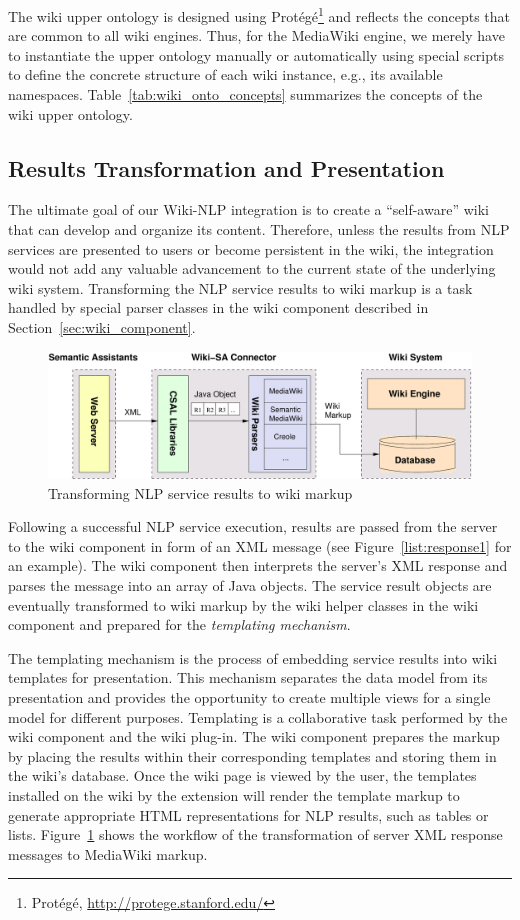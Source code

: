 The wiki upper ontology is designed using Prot\'{e}g\'{e}\footnote{Prot\'{e}g\'{e}, \url{http://protege.stanford.edu/}} and reflects the concepts that are common to all wiki engines. Thus, for the MediaWiki engine, we merely have to instantiate the upper ontology manually or automatically using special scripts to define the concrete structure of each wiki instance, e.g., its available namespaces. Table~\ref{tab:wiki_onto_concepts} summarizes the concepts of the wiki upper ontology.

\subsection{Results Transformation and Presentation}
The ultimate goal of our Wiki-NLP integration is to create a ``self-aware'' wiki that can develop and organize its content. Therefore, unless the results from NLP services are presented to users or become persistent in the wiki, the integration would not add any valuable advancement to the current state of the underlying wiki system. Transforming the NLP service results to wiki markup is a task handled by special parser classes in the wiki component described in Section~\ref{sec:wiki_component}.

\begin{figure}[h!]
\centering
\includegraphics[width=0.7\columnwidth]{pictures/result_transform.pdf}
\caption{Transforming NLP service results to wiki markup}
\label{fig:result_transform}
\end{figure}

Following a successful NLP service execution, results are passed from the \sa server to the wiki component in form of an XML message (see Figure~\ref{list:response1} for an example). The wiki component then interprets the server's XML response and parses the message into an array of Java objects. The service result objects are eventually transformed to wiki markup by the wiki helper classes in the wiki component and prepared for the \emph{templating mechanism}. 

The templating mechanism is the process of embedding service results into wiki templates for presentation. This mechanism separates the data model from its presentation and provides the opportunity to create multiple views for a single model for different purposes. Templating is a collaborative task performed by the wiki component and the wiki plug-in. The wiki component prepares the markup by placing the results within their corresponding templates and storing them in the wiki's database. Once the wiki page is viewed by the user, the templates installed on the wiki by the \sa extension will render the template markup to generate appropriate HTML representations for NLP results, such as tables or lists. Figure~\ref{fig:result_transform} shows the workflow of the transformation of server XML response messages to MediaWiki markup.


